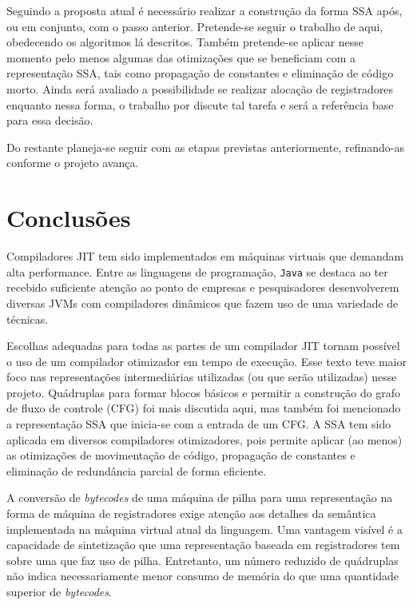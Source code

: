 Seguindo a proposta atual é necessário realizar a construção da forma
SSA após, ou em conjunto, com o passo anterior. Pretende-se seguir o
trabalho de  aqui, obedecendo os algoritmos lá
descritos. Também pretende-se aplicar nesse momento pelo menos algumas
das otimizações que se beneficiam com a representação SSA, tais como
propagação de constantes e eliminação de código morto. Ainda será
avaliado a possibilidade se realizar alocação de registradores
enquanto nessa forma, o trabalho por  discute
tal tarefa e será a referência base para essa decisão.

Do restante planeja-se seguir com as etapas previstas anteriormente,
refinando-as conforme o projeto avança.


\section{Conclusões}

Compiladores JIT tem sido implementados em máquinas virtuais que demandam
alta performance. Entre as linguagens de programação, \texttt{Java} se
destaca ao ter recebido suficiente atenção ao ponto de empresas e
pesquisadores desenvolverem diversas JVMs com compiladores
dinâmicos que fazem uso de uma variedade de técnicas.

Escolhas adequadas para todas as partes de um compilador JIT tornam
possível o uso de um compilador otimizador em tempo de execução. Esse
texto teve maior foco nas representações intermediárias utilizadas (ou
que serão utilizadas) nesse projeto. Quádruplas para formar blocos
básicos e permitir a construção do grafo de fluxo de controle (CFG)
foi mais discutida aqui, mas também foi mencionado a representação SSA
que inicia-se com a entrada de um CFG. A SSA tem sido aplicada em
diversos compiladores otimizadores, pois permite aplicar (ao menos)
as otimizações de movimentação de código, propagação de constantes e
eliminação de redundância parcial de forma eficiente.

A conversão de \textit{bytecodes} de uma máquina de pilha para uma
representação na forma de máquina de registradores exige atenção aos
detalhes da semântica implementada na máquina virtual atual da
linguagem. Uma vantagem visível é a capacidade de sintetização que
uma representação baseada em registradores tem sobre uma que faz uso
de pilha. Entretanto, um número reduzido de quádruplas não indica
necessariamente menor consumo de memória do que uma quantidade
superior de \textit{bytecodes}.



\let\stdsection\section
\def\section*#1{\stdsection{#1}}

\let\section\stdsection
